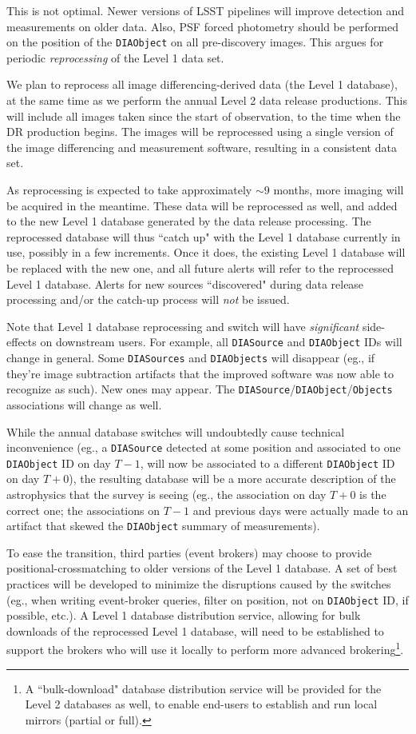 \documentclass[12pt]{article}
\newcommand{\code}[1]{\texttt{#1}}
\newcommand{\DIASource}{\code{DIASource}\xspace}
\newcommand{\DIASources}{\code{DIASources}\xspace}
\newcommand{\DIAObject}{\code{DIAObject}\xspace}
\newcommand{\DIAObjects}{\code{DIAObjects}\xspace}
\newcommand{\DB}{{Level 1 database}\xspace}
\newcommand{\DR}{{Level 2 database}\xspace}
\newcommand{\Objects}{\code{Objects}\xspace}
\begin{document}
This is not optimal. Newer versions of LSST pipelines will improve detection and measurements on older data. Also, PSF forced photometry should be performed on the position of the \DIAObject on all pre-discovery images. This argues for periodic {\em reprocessing} of the Level 1 data set.

\vspace{1em}

We plan to reprocess all image differencing-derived data (the \DB), at the same time as we perform the annual Level 2 data release productions. This will include all images taken since the start of observation, to the time when the DR production begins. The images will be reprocessed using a single version of the image differencing and measurement software, resulting in a consistent data set.

As reprocessing is expected to take approximately $\sim 9$ months, more imaging will be acquired in the meantime. These data will be reprocessed as well, and added to the new \DB generated by the data release processing. The reprocessed database will thus ``catch up" with the \DB currently in use, possibly in a few increments. Once it does, the existing \DB will be replaced with the new one, and all future alerts will refer to the reprocessed \DB. Alerts for new sources ``discovered" during data release processing and/or the catch-up process will {\em not} be issued.

\vspace{1em}
Note that \DB reprocessing and switch will have {\em significant} side-effects on downstream users. For example, all \DIASource and \DIAObject IDs will change in general. Some \DIASources and \DIAObjects will disappear (eg., if they're image subtraction artifacts that the improved software was now able to recognize as such). New ones may appear. The \DIASource/\DIAObject/\Objects associations will change as well.

While the annual database switches will undoubtedly cause technical inconvenience (eg., a \DIASource detected at some position and associated to one \DIAObject ID on day $T-1$, will now be associated to a different \DIAObject ID on day $T+0$), the resulting database will be a more accurate description of the astrophysics that the survey is seeing (eg., the association on day $T+0$ is the correct one; the associations on $T-1$ and previous days were actually made to an artifact that skewed the \DIAObject summary of measurements).

To ease the transition, third parties (event brokers) may choose to provide positional-crossmatching to older versions of the \DB. A set of best practices will be developed to minimize the disruptions caused by the switches (eg., when writing event-broker queries, filter on position, not on \DIAObject ID, if possible, etc.). A \DB distribution service, allowing for bulk downloads of the reprocessed \DB, will need to be established to support the brokers who will use it locally to perform more advanced brokering\footnote{A ``bulk-download" database distribution service will be provided for the \DR{}s as well, to enable end-users to establish and run local mirrors (partial or full).}.
\end{document}
